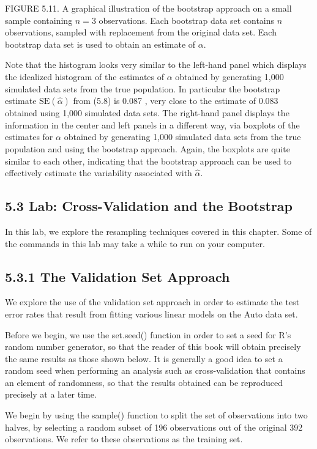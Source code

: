 \documentclass[10pt]{article}
\begin{document}
FIGURE 5.11. A graphical illustration of the bootstrap approach on a small sample containing $n=3$ observations. Each bootstrap data set contains $n$ observations, sampled with replacement from the original data set. Each bootstrap data set is used to obtain an estimate of $\alpha$.

Note that the histogram looks very similar to the left-hand panel which displays the idealized histogram of the estimates of $\alpha$ obtained by generating 1,000 simulated data sets from the true population. In particular the bootstrap estimate $\mathrm{SE}(\hat{\alpha})$ from (5.8) is 0.087 , very close to the estimate of 0.083 obtained using 1,000 simulated data sets. The right-hand panel displays the information in the center and left panels in a different way, via boxplots of the estimates for $\alpha$ obtained by generating 1,000 simulated data sets from the true population and using the bootstrap approach. Again, the boxplots are quite similar to each other, indicating that the bootstrap approach can be used to effectively estimate the variability associated with $\hat{\alpha}$.

\subsection*{5.3 Lab: Cross-Validation and the Bootstrap}
In this lab, we explore the resampling techniques covered in this chapter. Some of the commands in this lab may take a while to run on your computer.

\subsection*{5.3.1 The Validation Set Approach}
We explore the use of the validation set approach in order to estimate the test error rates that result from fitting various linear models on the Auto data set.

Before we begin, we use the set.seed() function in order to set a seed for R's random number generator, so that the reader of this book will obtain precisely the same results as those shown below. It is generally a good idea to set a random seed when performing an analysis such as cross-validation that contains an element of randomness, so that the results obtained can be reproduced precisely at a later time.

We begin by using the sample() function to split the set of observations into two halves, by selecting a random subset of 196 observations out of the original 392 observations. We refer to these observations as the training set.
\end{document}
